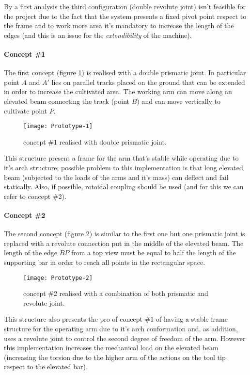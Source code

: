 	By a first analysis the third configuration (double revolute joint) isn't feasible for the project due to the fact that the system presents a fixed pivot point respect to the frame and to work more area it's mandatory to increase the length of the edges (and this is an issue for the \textit{extendibility} of the machine).
	
	\paragraph{Concept \#1} The first concept (figure \ref{fig:prot:1}) is realised with a double prismatic joint. In particular point $A$ and $A'$ lies on parallel tracks placed on the ground that can be extended in order to increase the cultivated area. The working arm can move along an elevated beam connecting the track (point $B$) and can move vertically to cultivate point $P$.
	
	\begin{figure}[bht]
		\centering \texttt{[image: Prototype-1]}
		\caption{concept \#1 realised with double prismatic joint.}
		\label{fig:prot:1}
	\end{figure}
	
	This structure present a frame for the arm that's stable while operating due to it's arch structure; possible problem to this implementation is that long elevated beam (subjected to the loads of the arms and it's mass) can deflect and fail statically. Also, if possible, rotoidal coupling should be used (and for this we can refer to concept \#2).
	
	\paragraph{Concept \#2}	The second concept (figure \ref{fig:prot:2}) is similar to the first one but one prismatic joint is replaced with a revolute connection put in the middle of the elevated beam. The length of the edge $BP$ from a top view must be equal to half the length of the supporting bar in order to reach all points in the rectangular space.

	\begin{figure}[bht]
		\centering \texttt{[image: Prototype-2]}
		\caption{concept \#2 realised with a combination of both prismatic and revolute joint.}
		\label{fig:prot:2}
	\end{figure}
	
	This structure also presents the pro of concept \#1 of having a stable frame structure for the operating arm due to it's arch conformation and, as addition, uses a revolute joint to control the second degree of freedom of the arm. However this implementation increases the mechanical load on the elevated beam (increasing the torsion due to the higher arm of the actions on the tool tip respect to the elevated bar).
	
